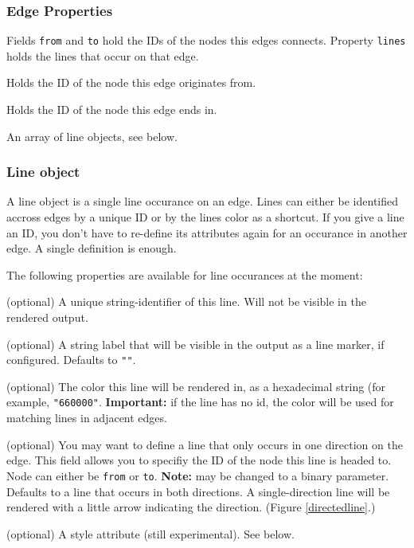 \documentclass[10pt,a4paper]{article}
\begin{document}
\subsubsection{Edge Properties}

Fields \texttt{from} and \texttt{to} hold the IDs of the nodes this edges connects. Property \texttt{lines} holds the lines that occur on that edge.

\begin{description}[align=right]
  \item[\texttt{from}] Holds the ID of the node this edge originates from.
  \item[\texttt{to}] Holds the ID of the node this edge ends in.
  \item[\texttt{lines}] An array of line objects, see below.
\end{description}

\subsubsection{Line object}

A line object is a single line occurance on an edge. Lines can either be identified accross edges by a unique ID or by the lines color as a shortcut. If you give a line an ID, you don't have to re-define its attributes again for an occurance in another edge. A single definition is enough.

The following properties are available for line occurances at the moment:

\begin{description}[align=right]
	\item[\texttt{id}] (optional) A unique string-identifier of this line. Will not be visible in the rendered output.
	\item[\texttt{label}] (optional) A string label that will be visible in the output as a line marker, if configured. Defaults to \texttt{""}.
	\item[\texttt{color}] (optional) The color this line will be rendered in, as a hexadecimal string (for example, \texttt{"660000"}. \textbf{Important:} if the line has no id, the color will be used for matching lines in adjacent edges.
	\item[\texttt{direction}] (optional) You may want to define a line that only occurs in one direction on the edge. This field allows you to specifiy the ID of the node this line is headed to. Node can either be \texttt{from} or \texttt{to}. \textbf{Note:} may be changed to a binary parameter. Defaults to a line that occurs in both directions. A single-direction line will be rendered with a little arrow indicating the direction. (Figure \ref{directedline}.)
	\item[\texttt{style}] (optional) A style attribute (still experimental). See below.
\end{description}
\end{document}
